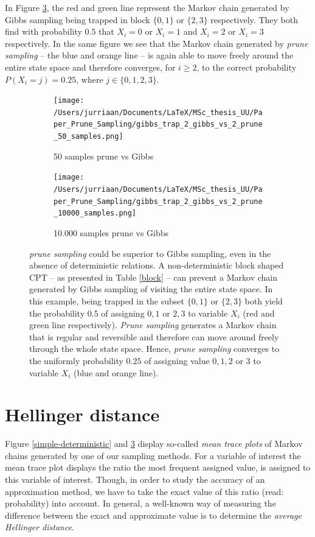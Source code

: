 \documentclass[a4paper, twoside, 11pt]{report}
\theoremstyle{plain}
\theoremstyle{definition}
\theoremstyle{remark}
\newcommand{\ps}{\textit{prune sampling }}
\begin{document}
In Figure \ref{block-BN}, the red and green line represent the Markov chain generated by Gibbs sampling being trapped in block $\{0, 1\}$ or $\{2,3\}$ respectively. They both find with probability $0.5$ that $X_i = 0$ or $X_i = 1$ and $X_i = 2$ or $X_i = 3$ respectively. In the same figure we see that the Markov chain generated by \ps -- the blue and orange line -- is again able to move freely around the entire state space and therefore converges, for $i \geq 2$, to the correct probability $P(X_i = j)= 0.25$, where $j \in \{0,1,2,3\}$.
\begin{figure}[h]
\centering
\begin{subfigure}{.49\textwidth}
  \centering
  \texttt{[image: /Users/jurriaan/Documents/LaTeX/MSc\_thesis\_UU/Paper\_Prune\_Sampling/gibbs\_trap\_2\_gibbs\_vs\_2\_prune\_50\_samples.png]}
  \caption{50 samples prune vs Gibbs}
  \label{fig:sub1}
\end{subfigure}
\begin{subfigure}{.49\textwidth}
  \centering
  \texttt{[image: /Users/jurriaan/Documents/LaTeX/MSc\_thesis\_UU/Paper\_Prune\_Sampling/gibbs\_trap\_2\_gibbs\_vs\_2\_prune\_10000\_samples.png]}
  \caption{10.000 samples prune vs Gibbs}
  \label{fig:sub2}
\end{subfigure}
\vspace{0.75pc}
\caption{\ps could be superior to Gibbs sampling, even in the absence of deterministic relations. A non-deterministic block shaped CPT -- as presented in Table \ref{block} -- can prevent a Markov chain generated by Gibbs sampling of visiting the entire state space. In this example, being trapped in the subset $\{0, 1\}$ or $\{2, 3\}$ both yield the probability $0.5$ of assigning $0,1$ or $2,3$ to variable $X_i$ (red and green line respectively). \textit{Prune sampling} generates a Markov chain that is regular and reversible and therefore can move around freely through the whole state space. Hence, \ps converges to the uniformly probability $0.25$ of assigning value $0,1,2$ or $3$ to variable $X_i$ (blue and orange line).} 
\label{block-BN}
\end{figure}

\section{Hellinger distance}
Figure \ref{simple-deterministic} and \ref{block-BN} display so-called \textit{mean trace plots} of Markov chains generated by one of our sampling methods. For a variable of interest the mean trace plot displays the ratio the most frequent assigned value, is assigned to this variable of interest. Though, in order to study the accuracy of an approximation method, we have to take the exact value of this ratio (read: probability) into account. In general, a well-known way of measuring the difference between the exact and approximate value is to determine the \textit{average Hellinger distance}. \\
\end{document}
